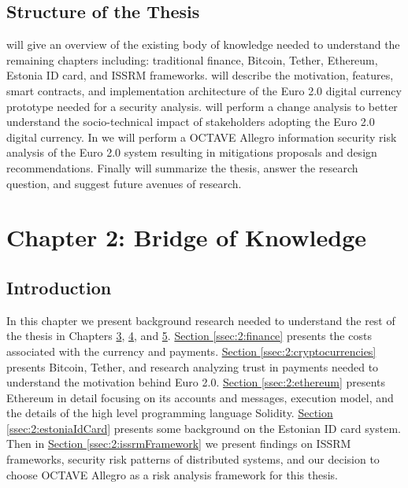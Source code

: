 \documentclass[a4paper,12pt]{article} %
\newcommand{\hypernameref}[1]{\hyperref[#1]{\nameref{#1}}}
\newcommand{\hypersectionref}[1]{\hyperref[#1]{Section \ref{#1}}}
\begin{document}
\subsection{Structure of the Thesis} \label{ssec:1.4}

\hypernameref{sec:2} will give an overview of the existing body of knowledge needed to understand the remaining chapters including: traditional finance, Bitcoin, Tether, Ethereum, Estonia ID card, and ISSRM frameworks. \hypernameref{sec:3} will describe the motivation, features, smart contracts, and implementation architecture of the Euro 2.0 digital currency prototype needed for a security analysis. \hypernameref{sec:4} will perform a change analysis to better understand the socio-technical impact of stakeholders adopting the Euro 2.0 digital currency. In \hypernameref{sec:5} we will perform a OCTAVE Allegro information security risk analysis of the Euro 2.0 system resulting in mitigations proposals and design recommendations. Finally \hypernameref{sec:6} will summarize the thesis, answer the research question, and suggest future avenues of research.

\pagebreak

\section{Chapter 2: Bridge of Knowledge} \label{sec:2}

\subsection{Introduction} \label{ssec:2:introduction}

In this chapter we present background research needed to understand the rest of the thesis in Chapters \hyperref[sec:3]{3}, \hyperref[sec:4]{4}, and \hyperref[sec:5]{5}. \hypersectionref{ssec:2:finance} presents the costs associated with the currency and payments. \hypersectionref{ssec:2:cryptocurrencies} presents Bitcoin, Tether, and research analyzing trust in payments needed to understand the motivation behind Euro 2.0. \hypersectionref{ssec:2:ethereum} presents Ethereum in detail focusing on its accounts and messages, execution model, and the details of the high level programming language Solidity. \hypersectionref{ssec:2:estoniaIdCard} presents some background on the Estonian ID card system. Then in \hypersectionref{ssec:2:issrmFramework} we present findings on ISSRM frameworks, security risk patterns of distributed systems, and our decision to choose OCTAVE Allegro as a risk analysis framework for this thesis.
\end{document}
